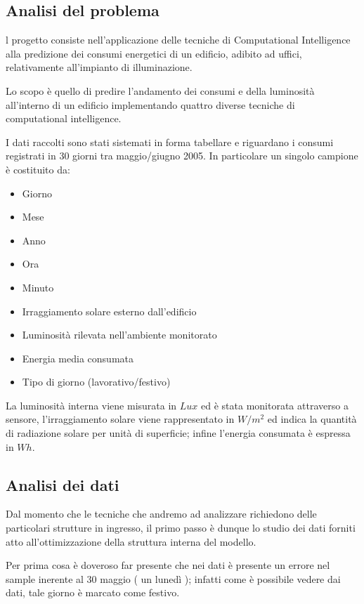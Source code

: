 \subsection{Analisi del problema}
l progetto consiste nell'applicazione delle tecniche di Computational Intelligence alla predizione dei consumi energetici di un edificio, adibito ad uffici, relativamente all'impianto di illuminazione.

Lo scopo è quello di predire l'andamento dei consumi e della luminosità all'interno di un edificio implementando quattro diverse tecniche di computational intelligence.

I dati raccolti sono stati sistemati in forma tabellare e riguardano i consumi registrati in 30 giorni tra maggio/giugno 2005. In particolare un singolo campione è costituito da:

\begin{itemize}
  \item Giorno
  \item Mese
  \item Anno
  \item Ora
  \item Minuto
  \item Irraggiamento solare esterno dall'edificio
  \item Luminosità rilevata nell'ambiente monitorato
  \item Energia media consumata
  \item Tipo di giorno (lavorativo/festivo)
\end{itemize}

La luminosità interna viene misurata in $Lux$ ed è stata monitorata attraverso a sensore, l’irraggiamento solare viene rappresentato in $W/m^2$ ed indica la quantità di radiazione solare per unità di superficie; infine l'energia consumata è espressa in $Wh$.


\subsection{Analisi dei dati}
Dal momento che le tecniche che andremo ad analizzare richiedono delle particolari strutture in ingresso, il primo passo è dunque lo studio dei dati forniti atto all'ottimizzazione della struttura interna del modello.

Per prima cosa è doveroso far presente che nei dati è presente un errore nel sample inerente al 30 maggio ( un lunedì ); infatti come è possibile vedere dai dati, tale giorno è marcato come festivo.

